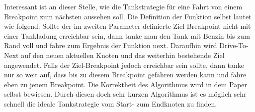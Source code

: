 \documentclass[11pt]{article}
\begin{document}
	Interessant ist an dieser Stelle, wie die Tankstrategie für eine Fahrt von einem Breakpoint zum nächsten aussehen soll. Die Definition der Funktion selbst lautet wie folgend: Sollte der im zweiten Parameter definierte Ziel-Breakpoint nicht mit einer Tankladung erreichbar sein, dann tanke man den Tank mit Benzin bis zum Rand voll und fahre zum Ergebnis der Funktion next. Daraufhin wird Drive-To-Next auf den neuen aktuellen Knoten und das weiterhin bestehende Ziel angewendet. Falls der Ziel-Breakpoint jedoch erreichbar sein sollte, dann tanke nur so weit auf, dass bis zu diesem Breakpoint gefahren werden kann und fahre eben zu jenem Breakpoint. Die Korrektheit des Algorithmus wird in dem Paper selbst bewiesen. Durch diesen doch sehr kurzen Algorithmus ist es möglich sehr schnell die ideale Tankstrategie vom Start- zum Endknoten zu finden.
	
\end{document}
